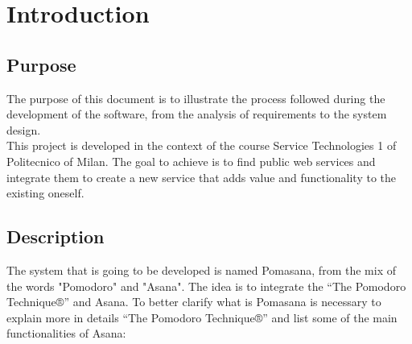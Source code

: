 


\chapter{Introduction}



	\section{Purpose}
	The purpose of this document is to illustrate the process followed during the development of the software, from the analysis of requirements to the system design.\\
	This project is developed in the context of the course Service Technologies 1 of Politecnico of Milan. The goal to achieve is to find public web services and integrate them to create a new service that adds value and functionality to the existing oneself. 




	\section{Description}
	The system that is going to be developed is named Pomasana, from the mix of the words "Pomodoro" and "Asana".
	The idea is to integrate the “The Pomodoro Technique®” and Asana. To better clarify what is Pomasana is necessary to explain more in details “The Pomodoro Technique®” and list some of the main functionalities of Asana:\\

